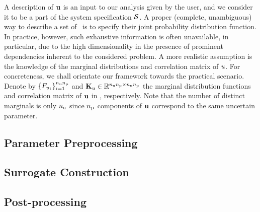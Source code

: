 A description of $\mathbf{u}$ is an input to our analysis given by the user, and we consider it to be a part of the system specification $\mathcal{S}$.
A proper (complete, unambiguous) way to describe a set of \rvs\ is to specify their joint probability distribution function.
In practice, however, such exhaustive information is often unavailable, in particular, due to the high dimensionality in the presence of prominent dependencies inherent to the considered problem.
A more realistic assumption is the knowledge of the marginal distributions and correlation matrix of $u$.
For concreteness, we shall orientate our framework towards the practical scenario.
Denote by $\{ F_{u_i} \}_{i = 1}^{{n_\text{u}} {n_\text{p}}}$ and $\mathbf{K}_u \in \mathbb{R}^{{n_\text{u}} {n_\text{p}} \times {n_\text{u}} {n_\text{p}}}$ the marginal distribution functions and correlation matrix of $\mathbf{u}$ in , respectively.
Note that the number of distinct marginals is only ${n_\text{u}}$ since ${n_\text{p}}$ components of $\mathbf{u}$ correspond to the same uncertain parameter.

\subsection{Parameter Preprocessing} 


\subsection{Surrogate Construction}


\subsection{Post-processing} 

